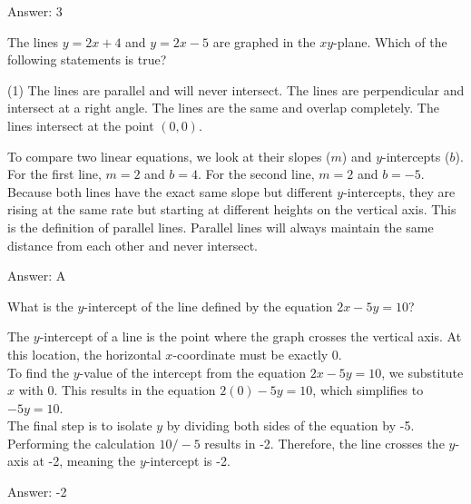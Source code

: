 \documentclass[11pt,paper=a4,answers]{exam}
\begin{document}
\begin{questions}
\begin{solution}
\vspace{15pt}
Answer: \colorbox{yellow!100}{3}
\end{solution}

\question
The lines $y = 2x + 4$ and $y = 2x - 5$ are graphed in the $xy$-plane. Which of the following statements is true?
\begin{tasks}(1)
    \task The lines are parallel and will never intersect.
    \task The lines are perpendicular and intersect at a right angle.
    \task The lines are the same and overlap completely.
    \task The lines intersect at the point $(0, 0)$.
\end{tasks}

\begin{solution}
To compare two linear equations, we look at their slopes ($m$) and $y$-intercepts ($b$). For the first line, $m = 2$ and $b = 4$. For the second line, $m = 2$ and $b = -5$.
\\[10pt]
Because both lines have the exact same slope but different $y$-intercepts, they are rising at the same rate but starting at different heights on the vertical axis. This is the definition of parallel lines. Parallel lines will always maintain the same distance from each other and never intersect.

\vspace{15pt}
Answer: \colorbox{yellow!100}{A}
\end{solution}

\question
What is the $y$-intercept of the line defined by the equation $2x - 5y = 10$?

\begin{solution}
The $y$-intercept of a line is the point where the graph crosses the vertical axis. At this location, the horizontal $x$-coordinate must be exactly 0. 
\\[10pt]
To find the $y$-value of the intercept from the equation $2x - 5y = 10$, we substitute $x$ with 0. This results in the equation $2(0) - 5y = 10$, which simplifies to $-5y = 10$.
\\[10pt]
The final step is to isolate $y$ by dividing both sides of the equation by -5. Performing the calculation $10 / -5$ results in -2. Therefore, the line crosses the $y$-axis at -2, meaning the $y$-intercept is -2.

\vspace{15pt}
Answer: \colorbox{yellow!100}{-2}
\end{solution}


\end{questions}
\end{document}
